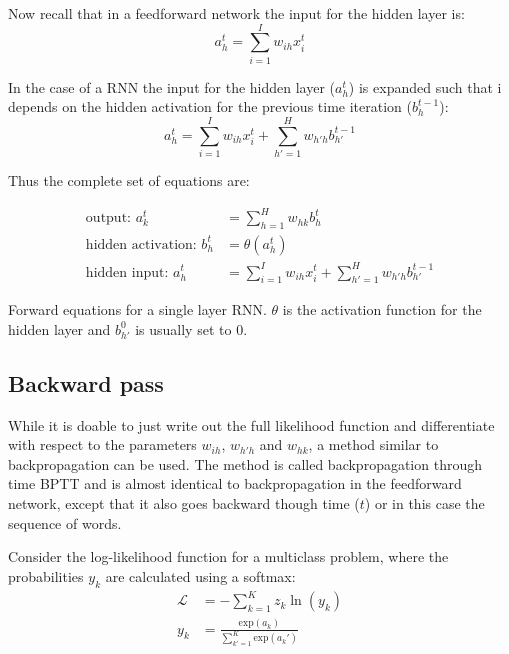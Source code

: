 Now recall that in a feedforward network the input for the hidden layer is:
\begin{equation}
a_h^t = \sum_{i=1}^I w_{i h} x_i^t
\end{equation}

In the case of a RNN the input for the hidden layer ($a_h^t$) is expanded such that i depends on the hidden activation for the previous time iteration ($b_h^{t-1}$):
\begin{equation}
a_h^t = \sum_{i=1}^I w_{i h} x_i^t + \sum_{h'=1}^H w_{h' h} b_{h'}^{t-1}
\end{equation}

Thus the complete set of equations are:
\begin{equationbox}[H]
\begin{equation*}
\begin{aligned}
\text{output: } a_k^t &= \sum_{h=1}^H w_{h k} b_h^t \\
\text{hidden activation: } b_h^t &= \theta(a_h^t) \\
\text{hidden input: } a_h^t &= \sum_{i=1}^I w_{i h} x_i^t + \sum_{h'=1}^H w_{h' h} b_{h'}^{t-1}
\end{aligned}
\end{equation*}
\caption{Forward equations for a single layer RNN. $\theta$ is the activation function for the hidden layer and $b_{h'}^{0}$ is usually set to $0$.}
\end{equationbox}

\subsection{Backward pass}

While it is doable to just write out the full likelihood function and differentiate with respect to the parameters $w_{i h}$, $w_{h' h}$ and $w_{h k}$, a method similar to backpropagation can be used. The method is called backpropagation through time BPTT and is almost identical to backpropagation in the feedforward network, except that it also goes backward though time ($t$) or in this case the sequence of words.

Consider the log-likelihood function for a multiclass problem, where the probabilities $y_k$ are calculated using a softmax:
\begin{equation}
\begin{aligned}
\mathcal{L} &= - \sum_{k=1}^K z_k \ln(y_k) \\
y_k &= \frac{\mathrm{exp}(a_k)} {\sum_{k'=1}^K \mathrm{exp}(a_k')}
\end{aligned}
\end{equation}

